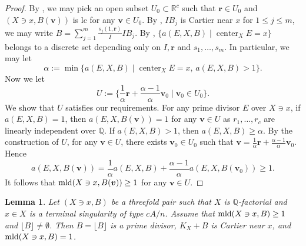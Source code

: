 \documentclass[11pt]{amsart}
\numberwithin{equation}{section}
\newcommand{\Qq}{\mathbb{Q}}
\newcommand{\Center}{\operatorname{center}}
\newcommand{\mld}{{\rm{mld}}}
\newtheorem{lem}[thm]{Lemma}
\theoremstyle{definition}
\theoremstyle{definition}
\begin{document}
\begin{proof}
By \cite[Theorem~5.6]{HLS19}, we may pick an open subset $U_0\subset\mathbb R^c$ such that $\bm{r}\in U_0$ and $(X\ni x,B(\bm{v}))$ is lc for any $\bm{v}\in U_0$. By \cite[Lemma~5.1]{Kaw88}, $IB_j$ is Cartier near $x$ for $1\leq j\leq m$, we may write $B=\sum_{j=1}^m \frac{s_j(1,\bm r)}{I} IB_j$. By \cite[Theorem~1.2]{Nak16}, $\{a(E,X,B)\mid \Center_{X}E=x\}$ belongs to a discrete set depending only on $I,\bm{r}$ and $s_1,\ldots,s_m$. In particular, we may let
$$\alpha:=\min\{a(E,X,B)\mid \Center_{X}E=x,\, a(E,X,B)>1\}.$$
Now we let
$$U:=\{\frac{1}{\alpha}\bm{r}+\frac{\alpha-1}{\alpha}\bm{v}_0\mid \bm{v}_0\in U_0\}.$$
We show that $U$ satisfies our requirements. For any prime divisor $E$ over $X\ni x$, if $a(E,X,B)=1$, then $a(E,X,B(\bm{v}))=1$ for any $\bm{v}\in U$ as $r_1,\dots,r_c$ are linearly independent over $\Qq$. If $a(E,X,B)>1$, then $a(E,X,B)\geq \alpha$. By the construction of $U$, for any $\bm{v}\in U$, there exists $\bm{v}_0\in U_0$ such that $\bm{v}=\frac{1}{\alpha}\bm{r}+\frac{\alpha-1}{\alpha}\bm{v}_0$. Hence
$$a(E,X,B(\bm{v}))=\frac{1}{\alpha}a(E,X,B)+\frac{\alpha-1}{\alpha}a(E,X,B(\bm{v}_0))\geq 1.$$
It follows that $\mld(X\ni x,B(\bm{v}))\geq 1$ for any $\bm{v}\in U$.
\end{proof}




\begin{lem}\label{lem: index conjecture threefold non-klt case}
Let $(X\ni x, B)$ be a threefold pair such that $X$ is $\Qq$-factorial and $x\in X$ is a terminal singularity of type $cA/n$. Assume that $\mld(X\ni x, B)\geq 1$ and $\lfloor B\rfloor\neq \emptyset$. Then $B=\lfloor B\rfloor$ is a prime divisor, $K_X+B$ is Cartier near $x$, and $\mld(X\ni x, B)=1$.
\end{lem}
\end{document}
